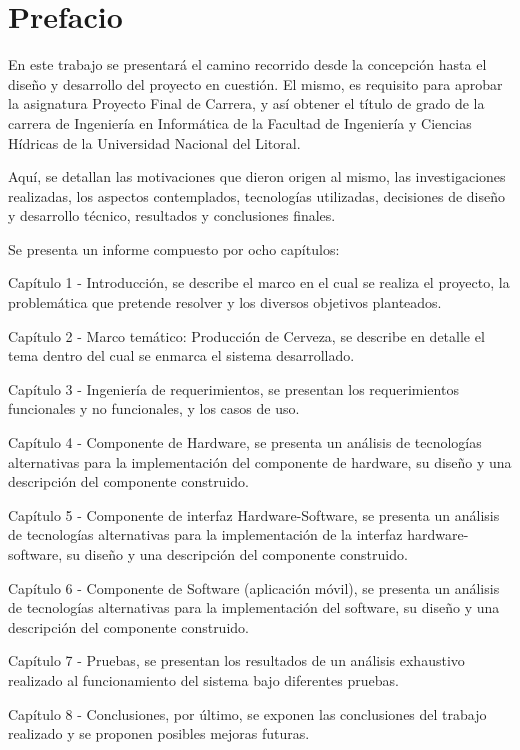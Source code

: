 \chapter*{Prefacio}
\par
En este trabajo se presentará el camino recorrido desde la concepción hasta el diseño y desarrollo del proyecto en cuestión. El mismo, es requisito para aprobar la asignatura Proyecto Final de Carrera, y así obtener el título de grado de la carrera de Ingeniería en Informática de la Facultad de Ingeniería y Ciencias Hídricas de la Universidad Nacional del Litoral.
\par
Aquí, se detallan las motivaciones que dieron origen al mismo, las investigaciones realizadas, los aspectos contemplados, tecnologías utilizadas, decisiones de diseño y desarrollo técnico, resultados y conclusiones finales.
\par
Se presenta un informe compuesto por ocho capítulos:
\par
Capítulo 1 - Introducción, se describe el marco en el cual se realiza el proyecto, la problemática que pretende resolver y los diversos objetivos planteados.
\par
Capítulo 2 - Marco temático: Producción de Cerveza, se describe en detalle el tema dentro del cual se enmarca el sistema desarrollado.
\par
Capítulo 3 - Ingeniería de requerimientos, se presentan los requerimientos funcionales y no funcionales, y los casos de uso.
\par
Capítulo 4 - Componente de Hardware, se presenta un análisis de tecnologías alternativas para la implementación del componente de hardware, su diseño y una descripción del componente construido.
\par
Capítulo 5 - Componente de interfaz Hardware-Software, se presenta un análisis de tecnologías alternativas para la implementación de la interfaz hardware-software, su diseño y una descripción del componente construido.
\par
Capítulo 6 - Componente de Software (aplicación móvil), se presenta un análisis de tecnologías alternativas para la implementación del software, su diseño y una descripción del componente construido.
\par
Capítulo 7 - Pruebas, se presentan los resultados de un análisis exhaustivo realizado al funcionamiento del sistema bajo diferentes pruebas.
\par
Capítulo 8 - Conclusiones, por último, se exponen las conclusiones del trabajo realizado y se proponen posibles mejoras futuras.
